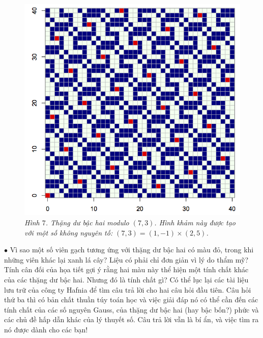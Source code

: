 \begin{multicols}{2}
	\begin{figure}[H]
		\vspace*{-5pt}
		\centering
		\captionsetup{labelformat= empty, justification=centering}
		\includegraphics[width= 0.85\linewidth]{mosaique-10.png}
		\caption{\small\textit{\color{toanhocdoisong}Hình $7$. Thặng dư bậc hai modulo $(7, 3)$. Hình khảm này được tạo với một số không nguyên tố: $(7, 3) = (1, -1) \times (2, 5)$.}}
		\vspace*{-10pt}
	\end{figure}
	$\bullet$ Vì sao một số viên gạch tương ứng với thặng dư bậc hai có màu đỏ, trong khi những viên khác lại xanh lá cây? Liệu có phải chỉ đơn giản vì lý do thẩm mỹ? Tính cân đối của họa tiết gợi ý rằng hai màu này thể hiện một tính chất khác của các thặng dư bậc hai. Nhưng đó là tính chất gì?
	\vskip 0.1cm
	Có thể lục lại các tài liệu lưu trữ của công ty Hafnia để tìm câu trả lời cho hai câu hỏi đầu tiên. Câu hỏi thứ ba thì có bản chất thuần túy toán học và việc giải đáp nó có thể cần đến các tính chất của các số nguyên Gauss, của thặng dư bậc hai (hay bậc bốn?) phức và các chủ đề hấp dẫn khác của lý thuyết số. Câu trả lời vẫn là bí ẩn, và việc tìm ra nó được dành cho các bạn!
	\vskip 0.2cm
\end{multicols}
